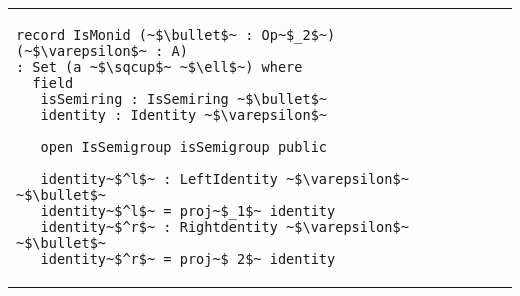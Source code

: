 \begin{adjustbox}{width=1.2\columnwidth,center}
\begin{tabular}{p{7cm} p{7cm} p{7cm}}
\begin{verbatim}
record IsMonid (~$\bullet$~ : Op~$_2$~) (~$\varepsilon$~ : A) 
: Set (a ~$\sqcup$~ ~$\ell$~) where 
  field 
   isSemiring : IsSemiring ~$\bullet$~ 
   identity : Identity ~$\varepsilon$~ 
       
   open IsSemigroup isSemigroup public 
   
   identity~$^l$~ : LeftIdentity ~$\varepsilon$~ ~$\bullet$~ 
   identity~$^l$~ = proj~$_1$~ identity 
   identity~$^r$~ : Rightdentity ~$\varepsilon$~ ~$\bullet$~ 
   identity~$^r$~ = proj~$_2$~ identity        
\end{verbatim}       
\end{tabular}  
\end{adjustbox}
